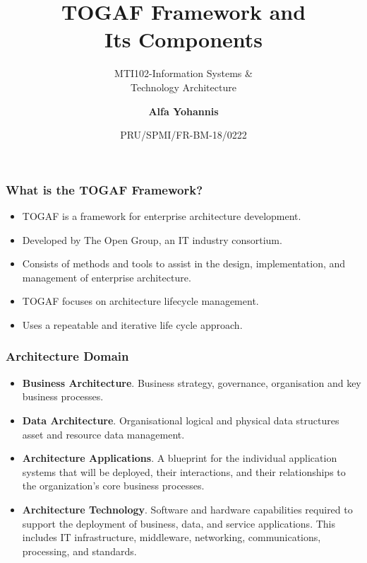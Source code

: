 \documentclass[aspectratio=169, table]{beamer}
\subtitle{MTI102-Information Systems \&\\Technology Architecture}
\title{TOGAF Framework and \\ Its Components}
\date[Serial]{\scriptsize {PRU/SPMI/FR-BM-18/0222}}
\author[Pradita]{\small {\textbf{Alfa Yohannis}}}
\begin{document}
    \frame{\titlepage}

    \begin{frame}
        \frametitle{What is the TOGAF Framework?}
        \begin{itemize}
            \item TOGAF is a framework for enterprise architecture development.
            \item Developed by The Open Group, an IT industry consortium.
            \item Consists of methods and tools to assist in the design, implementation, and management of enterprise architecture.
            \item TOGAF focuses on architecture lifecycle management.
            \item Uses a repeatable and iterative life cycle approach.
        \end{itemize}
    \end{frame}

    \begin{frame}
        \frametitle{Architecture Domain}
        \vspace{20pt}
        \begin{itemize}
            \item \textbf{Business Architecture}. Business strategy, governance, organisation and key business processes.

            \item \textbf{Data Architecture}. Organisational logical and physical data structures
            asset and resource data management.

            \item \textbf{Architecture Applications}. A blueprint for the individual application systems that will be deployed, their interactions, and their relationships to the organization's core business processes.

            \item \textbf{Architecture Technology}. Software and hardware capabilities required to support the deployment of business, data, and service applications. This includes IT infrastructure, middleware, networking, communications, processing, and standards.
        \end{itemize}
    \end{frame}
\end{document}
